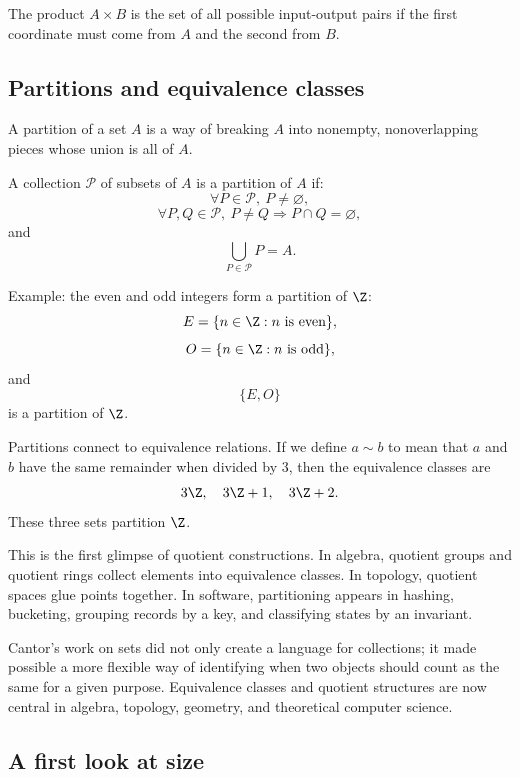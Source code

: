 \begin{intuitionbox}
The product $A\times B$ is the set of all possible input-output pairs if the first coordinate must come from $A$ and the second from $B$.
\end{intuitionbox}

\subsection{Partitions and equivalence classes}

A partition of a set $A$ is a way of breaking $A$ into nonempty, nonoverlapping pieces whose union is all of $A$.

\begin{formalbox}
A collection $\mathcal{P}$ of subsets of $A$ is a partition of $A$ if:
\[
\forall P\in\mathcal{P},\ P\neq\varnothing,
\]
\[
\forall P,Q\in\mathcal{P},\ P\neq Q\Rightarrow P\cap Q=\varnothing,
\]
and
\[
\bigcup_{P\in\mathcal{P}}P=A.
\]
\end{formalbox}

Example: the even and odd integers form a partition of $\Z$:
\[
E=\{n\in\Z:n\text{ is even}\},
\]
\[
O=\{n\in\Z:n\text{ is odd}\},
\]
and
\[
\{E,O\}
\]
is a partition of $\Z$.

Partitions connect to equivalence relations. If we define $a\sim b$ to mean that $a$ and $b$ have the same remainder when divided by $3$, then the equivalence classes are
\[
3\Z,\quad 3\Z+1,\quad 3\Z+2.
\]
These three sets partition $\Z$.

This is the first glimpse of quotient constructions. In algebra, quotient groups and quotient rings collect elements into equivalence classes. In topology, quotient spaces glue points together. In software, partitioning appears in hashing, bucketing, grouping records by a key, and classifying states by an invariant.

\begin{historybox}
Cantor's work on sets did not only create a language for collections; it made possible a more flexible way of identifying when two objects should count as the same for a given purpose. Equivalence classes and quotient structures are now central in algebra, topology, geometry, and theoretical computer science.
\end{historybox}

\subsection{A first look at size}


